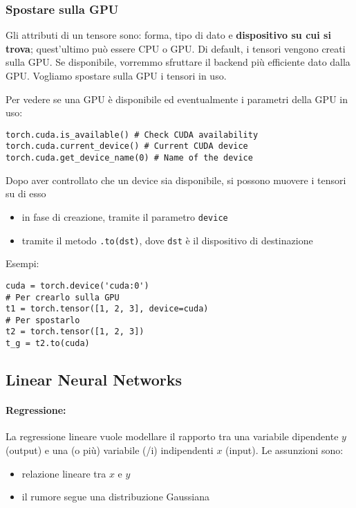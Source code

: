 \subsubsection{Spostare sulla GPU}

Gli attributi di un tensore sono: forma, tipo di dato e \textbf{dispositivo su cui si trova}; quest'ultimo può essere CPU o GPU. Di default, i tensori vengono creati sulla GPU. Se disponibile, vorremmo sfruttare il backend più efficiente dato dalla GPU. Vogliamo spostare sulla GPU i tensori in uso.

Per vedere se una GPU è disponibile ed eventualmente i parametri della GPU in uso:
\begin{verbatim}
torch.cuda.is_available() # Check CUDA availability
torch.cuda.current_device() # Current CUDA device
torch.cuda.get_device_name(0) # Name of the device
\end{verbatim}

Dopo aver controllato che un device sia disponibile, si possono muovere i tensori su di esso
\begin{itemize}
    \item in fase di creazione, tramite il parametro \texttt{device}
    
    \item tramite il metodo \texttt{.to(dst)}, dove \texttt{dst} è il dispositivo di destinazione
\end{itemize}

Esempi:
\begin{verbatim}
cuda = torch.device('cuda:0')
# Per crearlo sulla GPU
t1 = torch.tensor([1, 2, 3], device=cuda)
# Per spostarlo
t2 = torch.tensor([1, 2, 3])
t_g = t2.to(cuda)
\end{verbatim}

\subsection{Linear Neural Networks}

\paragraph{Regressione:} La regressione lineare vuole modellare il rapporto tra una variabile dipendente $y$ (output) e una (o più) variabile (/i) indipendenti $x$ (input). Le assunzioni sono: 
\begin{itemize}
    \item relazione lineare tra $x$ e $y$
    
    \item il rumore segue una distribuzione Gaussiana
\end{itemize}


